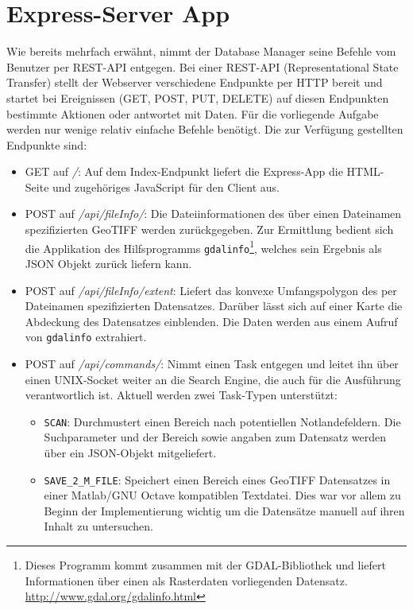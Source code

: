 \documentclass[10pt,a4paper]{report}
\begin{document}
\section{Express-Server App}

Wie bereits mehrfach erwähnt, nimmt der Database Manager seine Befehle vom Benutzer per REST-API entgegen. Bei einer REST-API (Representational State Transfer) stellt der Webserver verschiedene Endpunkte per HTTP bereit und startet bei Ereignissen (GET, POST, PUT, DELETE) auf diesen Endpunkten bestimmte Aktionen oder antwortet mit Daten. Für die vorliegende Aufgabe werden nur wenige relativ einfache Befehle benötigt. Die zur Verfügung gestellten Endpunkte sind:

\begin{itemize}
	\item GET auf \emph{/}: Auf dem Index-Endpunkt liefert die Express-App die HTML-Seite und zugehöriges JavaScript für den Client aus.
	\item POST auf \emph{/api/fileInfo/}: Die Dateiinformationen des über einen Dateinamen spezifizierten GeoTIFF werden zurückgegeben. Zur Ermittlung bedient sich die Applikation des Hilfsprogramms \texttt{gdalinfo}\footnote{Dieses Programm kommt zusammen mit der GDAL-Bibliothek und liefert Informationen über einen als Rasterdaten vorliegenden Datensatz. \href{http://www.gdal.org/gdalinfo.html}{http://www.gdal.org/gdalinfo.html}}, welches sein Ergebnis als JSON Objekt zurück liefern kann.
	\item POST auf \emph{/api/fileInfo/extent}: Liefert das konvexe Umfangspolygon des per Datei\-namen spezifizierten Datensatzes. Darüber lässt sich auf einer Karte die Abdeckung des Datensatzes einblenden. Die Daten werden aus einem Aufruf von \texttt{gdalinfo} extrahiert.
	\item POST auf \emph{/api/commands/}: Nimmt einen Task entgegen und leitet ihn über einen UNIX-Socket weiter an die Search Engine, die auch für die Ausführung verantwortlich ist. Aktuell werden zwei Task-Typen unterstützt:
	\begin{itemize}
		\item \texttt{SCAN}: Durchmustert einen Bereich nach potentiellen Notlandefeldern. Die Suchparameter und der Bereich sowie angaben zum Datensatz werden über ein JSON-Objekt mitgeliefert.
		\item \texttt{SAVE\_2\_M\_FILE}: Speichert einen Bereich eines GeoTIFF Datensatzes in einer Matlab/GNU Octave kompatiblen Textdatei. Dies war vor allem zu Beginn der Implementierung wichtig um die Datensätze manuell auf ihren Inhalt zu untersuchen.

\end{itemize}
\end{itemize}
\end{document}
